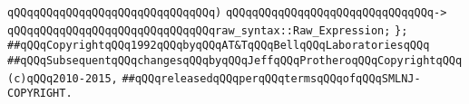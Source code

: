 \verb|qQQqqQQqqQQqqQQqqQQqqQQqqQQqqQQq)|\newline
\verb|qQQqqQQqqQQqqQQqqQQqqQQqqQQqqQQq->|\newline
\verb|qQQqqQQqqQQqqQQqqQQqqQQqqQQqqQQqraw_syntax::Raw_Expression;|\newline
\newline
\verb|};|\newline
\newline
\newline
\verb|##qQQqCopyrightqQQq1992qQQqbyqQQqAT&TqQQqBellqQQqLaboratoriesqQQq|\newline
\verb|##qQQqSubsequentqQQqchangesqQQqbyqQQqJeffqQQqProtheroqQQqCopyrightqQQq(c)qQQq2010-2015,|\newline
\verb|##qQQqreleasedqQQqperqQQqtermsqQQqofqQQqSMLNJ-COPYRIGHT.|\newline


